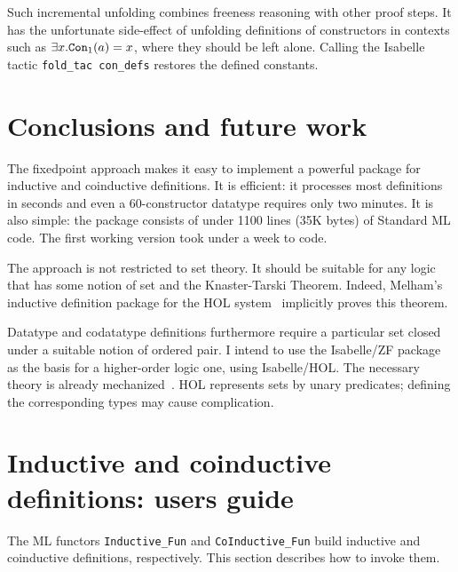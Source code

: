 Such incremental unfolding combines freeness reasoning with other proof
steps.  It has the unfortunate side-effect of unfolding definitions of
constructors in contexts such as $\exists x.{\tt Con}_1(a)=x$, where they should
be left alone.  Calling the Isabelle tactic {\tt fold\_tac con\_defs}
restores the defined constants.
\fi  %

\section{Conclusions and future work}
The fixedpoint approach makes it easy to implement a powerful
package for inductive and coinductive definitions.  It is efficient: it
processes most definitions in seconds and even a 60-constructor datatype
requires only two minutes.  It is also simple: the package consists of
under 1100 lines (35K bytes) of Standard ML code.  The first working
version took under a week to code.

The approach is not restricted to set theory.  It should be suitable for
any logic that has some notion of set and the Knaster-Tarski Theorem.
Indeed, Melham's inductive definition package for the HOL
system~\cite{camilleri92} implicitly proves this theorem.

Datatype and codatatype definitions furthermore require a particular set
closed under a suitable notion of ordered pair.  I intend to use the
Isabelle/ZF package as the basis for a higher-order logic one, using
Isabelle/HOL\@.  The necessary theory is already
mechanized~\cite{paulson-coind}.  HOL represents sets by unary predicates;
defining the corresponding types may cause complication.





\ifCADE{}
\else
\newpage
\appendix
\section{Inductive and coinductive definitions: users guide}
The ML functors \verb|Inductive_Fun| and \verb|CoInductive_Fun| build
inductive and coinductive definitions, respectively.  This section describes
how to invoke them.  

